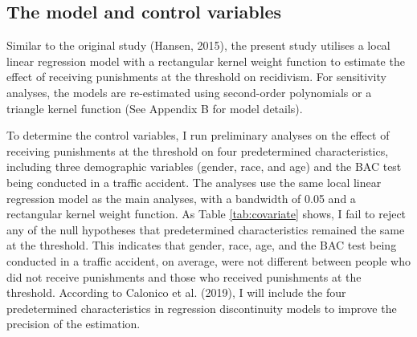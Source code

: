 \documentclass[
  11pt,
]{article}
\begin{document}
\hypertarget{the-model-and-control-variables}{%
\subsection{The model and control
variables}\label{the-model-and-control-variables}}

Similar to the original study (Hansen, 2015), the present study utilises
a local linear regression model with a rectangular kernel weight
function to estimate the effect of receiving punishments at the
threshold on recidivism. For sensitivity analyses, the models are
re-estimated using second-order polynomials or a triangle kernel
function (See Appendix B for model details).

To determine the control variables, I run preliminary analyses on the
effect of receiving punishments at the threshold on four predetermined
characteristics, including three demographic variables (gender, race,
and age) and the BAC test being conducted in a traffic accident. The
analyses use the same local linear regression model as the main
analyses, with a bandwidth of 0.05 and a rectangular kernel weight
function. As Table \ref{tab:covariate} shows, I fail to reject any of
the null hypotheses that predetermined characteristics remained the same
at the threshold. This indicates that gender, race, age, and the BAC
test being conducted in a traffic accident, on average, were not
different between people who did not receive punishments and those who
received punishments at the threshold. According to Calonico et al.
(2019), I will include the four predetermined characteristics in
regression discontinuity models to improve the precision of the
estimation.

\begingroup
\renewcommand{\arraystretch}{1.3}
\end{document}
